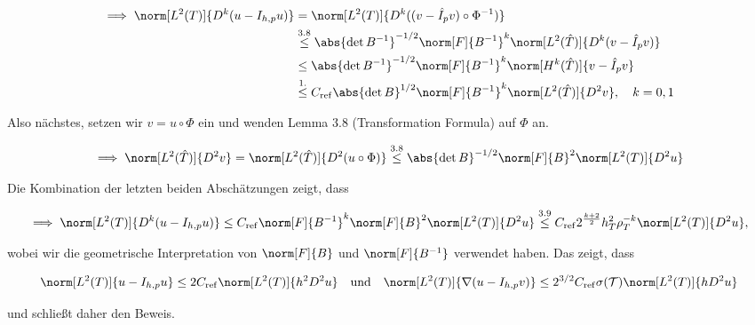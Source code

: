 \begin{solution}
\begin{enumerate}[label = \textbf{\alph*)}]
\begin{enumerate}[label = \arabic*.]
      \begin{align*}
        \implies
        \norm[L^2(T)]{D^k (u - I_{h, p} u)}
        & =
        \norm[L^2(T)]{D^k ((v - \hat I_p v) \circ \Phi^{-1})} \\
        & \stackrel
        {
          \mathrm{3.8}
        }{\leq}
        \abs{\det B^{-1}}^{-1/2} \norm[F]{B^{-1}}^k \norm[L^2(\hat T)]{D^k (v - \hat I_p v)} \\
        & \leq
        \abs{\det B^{-1}}^{-1/2} \norm[F]{B^{-1}}^k \norm[H^k(\hat T)]{v - \hat I_p v} \\
        & \stackrel
        {
          \mathrm{1.}
        }{\leq}
        C_\mathrm{ref} \abs{\det B}^{1/2} \norm[F]{B^{-1}}^k \norm[L^2(\hat T)]{D^2 v},
        \quad
        k = 0, 1
      \end{align*}
  
      Also nächstes, setzen wir $v = u \circ \Phi$ ein und wenden Lemma 3.8 (Transformation Formula) auf $\Phi$ an.
  
      \begin{align*}
        \implies
        \norm[L^2(\hat T)]{D^2 v}
        =
        \norm[L^2(\hat T)]{D^2 (u \circ \Phi)}
        \stackrel
        {
          \mathrm{3.8}
        }{\leq}
        \abs{\det B}^{-1/2} \norm[F]{B}^2 \norm[L^2(T)]{D^2 u}
      \end{align*}
  
      Die Kombination der letzten beiden Abschätzungen zeigt, dass
  
      \begin{align*}
        \implies
        \norm[L^2(T)]{D^k (u - I_{h, p} u)}
        \leq
        C_\mathrm{ref} \norm[F]{B^{-1}}^k \norm[F]{B}^2 \norm[L^2(T)]{D^2 u}
        \stackrel
        {
          \mathrm{3.9}
        }{\leq}
        C_\mathrm{ref} 2^\frac{k+2}{2} h_T^2 \rho_T^{-k} \norm[L^2(T)]{D^2 u},
      \end{align*}
  
      wobei wir die geometrische Interpretation von $\norm[F]{B}$ und $\norm[F]{B^{-1}}$ verwendet haben.
      Das zeigt, dass
  
      \begin{align*}
        \norm[L^2(T)]{u - I_{h, p} u}
        \leq
        2 C_\mathrm{ref} \norm[L^2(T)]{h^2 D^2 u}
        \quad
        \text{und}
        \quad
        \norm[L^2(T)]{\nabla (u - I_{h, p} v)}
        \leq 2^{3/2} C_\mathrm{ref} \sigma(\mathcal{T}) \norm[L^2(T)]{h D^2 u}
      \end{align*}
  
      und schließt daher den Beweis.
  
    \end{enumerate}
  
  \end{enumerate}
  
  \end{solution}
  
  